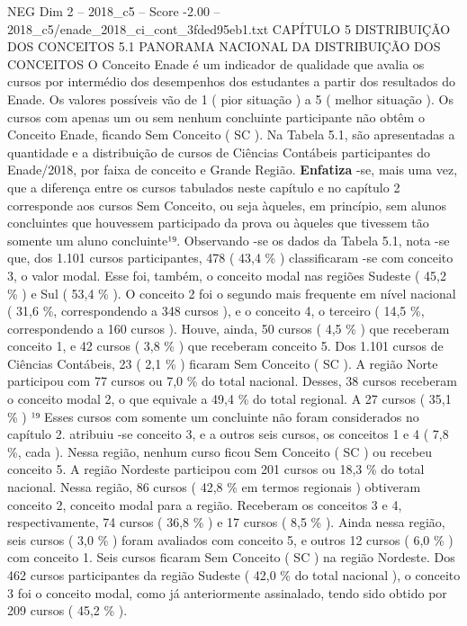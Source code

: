 \begin{textsample}{NEG Dim 2 – 2018\_c5 – Score -2.00 – 2018\_c5/enade\_2018\_ci\_cont\_3fded95eb1.txt}  \label{ex:f2_neg_112}
CAPÍTULO 5 DISTRIBUIÇÃO DOS CONCEITOS 5.1 PANORAMA NACIONAL DA DISTRIBUIÇÃO DOS CONCEITOS O Conceito Enade é um indicador de qualidade que avalia os cursos por intermédio dos desempenhos dos estudantes a partir dos resultados do Enade.
Os valores possíveis vão de 1 ( pior situação ) a 5 ( melhor situação ).
Os cursos com apenas um ou sem nenhum concluinte participante não obtêm o Conceito Enade, ficando Sem Conceito ( SC ).
Na Tabela 5.1, são apresentadas a quantidade e a distribuição de cursos de Ciências Contábeis participantes do Enade/2018, por faixa de conceito e Grande Região. \textbf{Enfatiza} -se, mais uma vez, que a diferença entre os cursos tabulados neste capítulo e no capítulo 2 corresponde aos cursos Sem Conceito, ou seja àqueles, em princípio, sem alunos concluintes que houvessem participado da prova ou àqueles que tivessem tão somente um aluno concluinte¹⁹.
Observando -se os dados da Tabela 5.1, nota -se que, dos 1.101 cursos participantes, 478 ( 43,4 \% ) classificaram -se com conceito 3, o valor modal.
Esse foi, também, o conceito modal nas regiões Sudeste ( 45,2 \% ) e Sul ( 53,4 \% ).
O conceito 2 foi o segundo mais frequente em nível nacional ( 31,6 \%, correspondendo a 348 cursos ), e o conceito 4, o terceiro ( 14,5 \%, correspondendo a 160 cursos ).
Houve, ainda, 50 cursos ( 4,5 \% ) que receberam conceito 1, e 42 cursos ( 3,8 \% ) que receberam conceito 5.
Dos 1.101 cursos de Ciências Contábeis, 23 ( 2,1 \% ) ficaram Sem Conceito ( SC ).
A região Norte participou com 77 cursos ou 7,0 \% do total nacional.
Desses, 38 cursos receberam o conceito modal 2, o que equivale a 49,4 \% do total regional.
A 27 cursos ( 35,1 \% ) ¹⁹ Esses cursos com somente um concluinte não foram considerados no capítulo 2. atribuiu -se conceito 3, e a outros seis cursos, os conceitos 1 e 4 ( 7,8 \%, cada ).
Nessa região, nenhum curso ficou Sem Conceito ( SC ) ou recebeu conceito 5.
A região Nordeste participou com 201 cursos ou 18,3 \% do total nacional.
Nessa região, 86 cursos ( 42,8 \% em termos regionais ) obtiveram conceito 2, conceito modal para a região.
Receberam os conceitos 3 e 4, respectivamente, 74 cursos ( 36,8 \% ) e 17 cursos ( 8,5 \% ).
Ainda nessa região, seis cursos ( 3,0 \% ) foram avaliados com conceito 5, e outros 12 cursos ( 6,0 \% ) com conceito 1.
Seis cursos ficaram Sem Conceito ( SC ) na região Nordeste.
Dos 462 cursos participantes da região Sudeste ( 42,0 \% do total nacional ), o conceito 3 foi o conceito modal, como já anteriormente assinalado, tendo sido obtido por 209 cursos ( 45,2 \% ).

\end{textsample}
